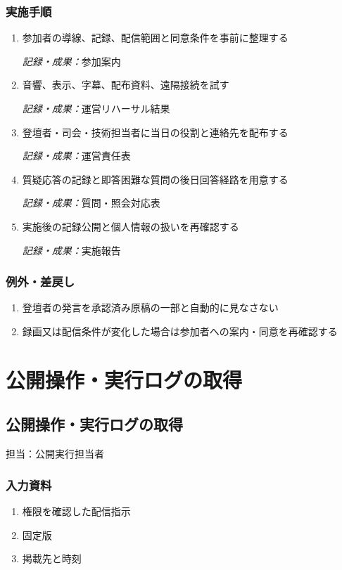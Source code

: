 \documentclass[a4paper,11pt]{article}
\begin{document}
\subsubsection*{実施手順}
\begin{enumerate}[leftmargin=2em,itemsep=0.65em]
\item 参加者の導線、記録、配信範囲と同意条件を事前に整理する\par\noindent\textit{記録・成果：}参加案内\nobreak\smallskip
\item 音響、表示、字幕、配布資料、遠隔接続を試す\par\noindent\textit{記録・成果：}運営リハーサル結果\nobreak\smallskip
\item 登壇者・司会・技術担当者に当日の役割と連絡先を配布する\par\noindent\textit{記録・成果：}運営責任表\nobreak\smallskip
\item 質疑応答の記録と即答困難な質問の後日回答経路を用意する\par\noindent\textit{記録・成果：}質問・照会対応表\nobreak\smallskip
\item 実施後の記録公開と個人情報の扱いを再確認する\par\noindent\textit{記録・成果：}実施報告\nobreak\smallskip
\end{enumerate}
\subsubsection*{例外・差戻し}
\begin{enumerate}[leftmargin=2em,itemsep=0.35em]
\item 登壇者の発言を承認済み原稿の一部と自動的に見なさない
\item 録画又は配信条件が変化した場合は参加者への案内・同意を再確認する
\end{enumerate}
\section{公開操作・実行ログの取得}
\subsection{公開操作・実行ログの取得}
\par 担当：公開実行担当者\par\medskip
\subsubsection*{入力資料}
\begin{enumerate}[leftmargin=2em,itemsep=0.35em]
\item 権限を確認した配信指示
\item 固定版
\item 掲載先と時刻
\end{enumerate}
\end{document}
